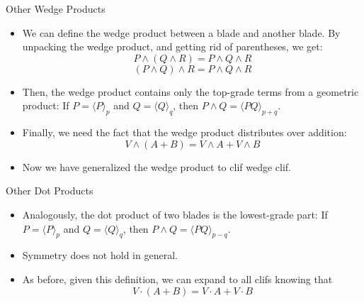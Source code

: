 \documentclass[aspectratio=169,xcolor=dvipsnames]{beamer}
\begin{document}


\begin{frame}{Other Wedge Products}


\begin{itemize}
      \item We can define the wedge product between a blade and another blade. By unpacking
            the wedge product, and getting rid of parentheses, we get:
            $$P \land (Q \land R) = P\land Q\land R$$
            $$(P \land Q) \land R = P\land Q\land R$$
      \item Then, the wedge product contains only the top-grade terms from a geometric
            product:
            If $P = \langle P \rangle_p$ and $Q = \langle Q \rangle_q$, then $P \land Q = \langle PQ \rangle_{p+q}$.
      \item Finally, we need the fact that the wedge product distributes over addition:
            $$V \land (A + B) = V \land A + V \land B$$
      \item Now we have generalized the wedge product to clif wedge clif.

\end{itemize}
\end{frame}
      


\begin{frame}{Other Dot Products}


\begin{itemize}
      \item Analogously, the dot product of two blades is the lowest-grade part: 
            If $P = \langle P \rangle_p$ and $Q = \langle Q \rangle_q$, then $P \land Q = \langle PQ \rangle_{p-q}$.
      \item Symmetry does not hold in general.
      \item As before, given this definition, we can expand to all clifs knowing that
            $$V \cdot (A+B) = V\cdot A + V \cdot B$$


\end{itemize}
\end{frame}
      
\end{document}
